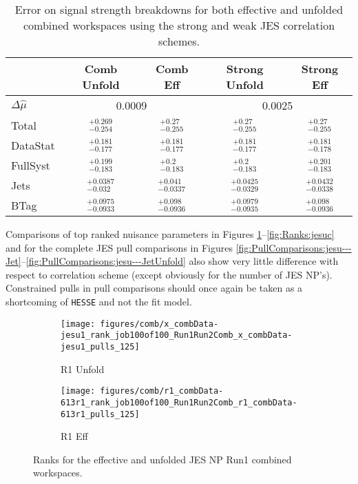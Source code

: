 \begin{table}[!htbp]\captionsetup{justification=centering}
\begin{center}\begin{tabular}{lcccc}
\hline
 & Comb Unfold & Comb Eff & Strong Unfold & Strong Eff\\
\hline\hline
$\Delta\hat{\mu}$ &  \multicolumn{2}{|c|}{0.0009} &  \multicolumn{2}{|c|}{0.0025}\\
\hline
Total &  $^{+ 0.269}_{-0.254}$ &  $^{+ 0.27}_{-0.255}$ &  $^{+ 0.27}_{-0.255}$ &  $^{+ 0.27}_{-0.255}$\\
\hline
DataStat &  $^{+ 0.181}_{-0.177}$ &  $^{+ 0.181}_{-0.177}$ &  $^{+ 0.181}_{-0.177}$ &  $^{+ 0.181}_{-0.178}$\\
\hline
FullSyst &  $^{+ 0.199}_{-0.183}$ &  $^{+ 0.2}_{-0.183}$ &  $^{+ 0.2}_{-0.183}$ &  $^{+ 0.201}_{-0.183}$\\
\hline
Jets &  $^{+ 0.0387}_{-0.032}$ &  $^{+ 0.041}_{-0.0337}$ &  $^{+ 0.0425}_{-0.0329}$ &  $^{+ 0.0432}_{-0.0338}$\\
\hline
BTag &  $^{+ 0.0975}_{-0.0933}$ &  $^{+ 0.098}_{-0.0936}$ &  $^{+ 0.0979}_{-0.0935}$ &  $^{+ 0.098}_{-0.0936}$\\
\hline\hline
\end{tabular}
\caption{Error on signal strength breakdowns for both effective and unfolded combined workspaces using the strong and weak JES correlation schemes.}

\label{tab:sw_jes_breakdowns}\end{center}
\end{table}

Comparisons of top ranked nuisance parameters in Figures \ref{fig:Ranks:jesu1}--\ref{fig:Ranks:jesuc} and for the complete JES pull comparisons in Figures \ref{fig:PullComparisons:jesu---Jet}--\ref{fig:PullComparisons:jesu---JetUnfold} also show very little difference with respect to correlation scheme (except obviously for the number of JES NP's).  Constrained pulls in pull comparisons should once again be taken as a shortcoming of \texttt{HESSE} and not the fit model.
\begin{figure}[!htbp]\captionsetup{justification=centering}
  \centering
\begin{subfigure}[t]{0.45000\textwidth}\centering\texttt{[image: figures/comb/x\_combData-jesu1\_rank\_job100of100\_Run1Run2Comb\_x\_combData-jesu1\_pulls\_125]}\caption{R1 Unfold}\end{subfigure}
\begin{subfigure}[t]{0.45000\textwidth}\centering\texttt{[image: figures/comb/r1\_combData-613r1\_rank\_job100of100\_Run1Run2Comb\_r1\_combData-613r1\_pulls\_125]}\caption{R1 Eff}\end{subfigure}
  \caption{Ranks for the effective and unfolded JES NP Run1 combined workspaces.}
    \label{fig:Ranks:jesu1}
\end{figure}

